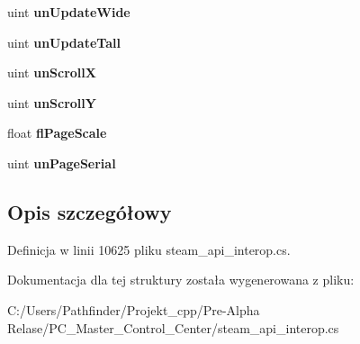 \begin{DoxyCompactItemize}
uint {\bfseries un\+Update\+Wide}
\item 
\mbox{\label{struct_valve_1_1_steamworks_1_1_h_t_m_l___needs_paint__t_a1f557924e92c2d236e9ea7b681f3e3e4}} 
uint {\bfseries un\+Update\+Tall}
\item 
\mbox{\label{struct_valve_1_1_steamworks_1_1_h_t_m_l___needs_paint__t_a41aef0410020e540d90f7acaa7f7a808}} 
uint {\bfseries un\+ScrollX}
\item 
\mbox{\label{struct_valve_1_1_steamworks_1_1_h_t_m_l___needs_paint__t_a00f9150a4fa4f6ea9f5d05f728a7ca55}} 
uint {\bfseries un\+ScrollY}
\item 
\mbox{\label{struct_valve_1_1_steamworks_1_1_h_t_m_l___needs_paint__t_a5270535de39bc1ff0bd5ae964b76a97c}} 
float {\bfseries fl\+Page\+Scale}
\item 
\mbox{\label{struct_valve_1_1_steamworks_1_1_h_t_m_l___needs_paint__t_a6709bf316f97d90b7d0a7f1c2f9add5c}} 
uint {\bfseries un\+Page\+Serial}
\end{DoxyCompactItemize}


\subsection{Opis szczegółowy}


Definicja w linii 10625 pliku steam\+\_\+api\+\_\+interop.\+cs.



Dokumentacja dla tej struktury została wygenerowana z pliku\+:\begin{DoxyCompactItemize}
\item 
C\+:/\+Users/\+Pathfinder/\+Projekt\+\_\+cpp/\+Pre-\/\+Alpha Relase/\+P\+C\+\_\+\+Master\+\_\+\+Control\+\_\+\+Center/steam\+\_\+api\+\_\+interop.\+cs\end{DoxyCompactItemize}
